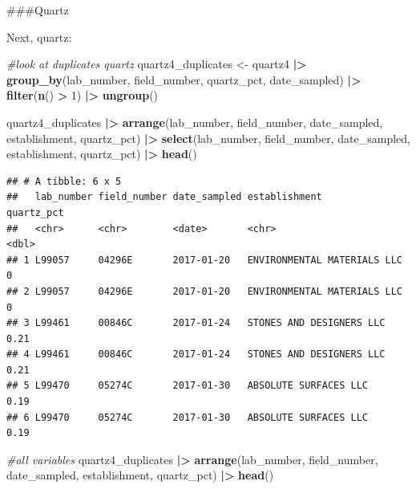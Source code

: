 \documentclass[
]{article}
\newenvironment{Shaded}{\begin{snugshade}}{\end{snugshade}}
\newcommand{\CommentTok}[1]{\textcolor[rgb]{0.56,0.35,0.01}{\textit{#1}}}
\newcommand{\DecValTok}[1]{\textcolor[rgb]{0.00,0.00,0.81}{#1}}
\newcommand{\FunctionTok}[1]{\textcolor[rgb]{0.13,0.29,0.53}{\textbf{#1}}}
\newcommand{\NormalTok}[1]{#1}
\newcommand{\OtherTok}[1]{\textcolor[rgb]{0.56,0.35,0.01}{#1}}
\newcommand{\SpecialCharTok}[1]{\textcolor[rgb]{0.81,0.36,0.00}{\textbf{#1}}}
\begin{document}
\#\#\#Quartz

Next, quartz:

\begin{Shaded}
\begin{Highlighting}[]
\CommentTok{\#look at duplicates quartz}
\NormalTok{quartz4\_duplicates }\OtherTok{\textless{}{-}}\NormalTok{ quartz4 }\SpecialCharTok{|\textgreater{}}
  \FunctionTok{group\_by}\NormalTok{(lab\_number, field\_number, quartz\_pct, date\_sampled) }\SpecialCharTok{|\textgreater{}}
  \FunctionTok{filter}\NormalTok{(}\FunctionTok{n}\NormalTok{() }\SpecialCharTok{\textgreater{}} \DecValTok{1}\NormalTok{) }\SpecialCharTok{|\textgreater{}}
  \FunctionTok{ungroup}\NormalTok{() }

\NormalTok{quartz4\_duplicates }\SpecialCharTok{|\textgreater{}}  
  \FunctionTok{arrange}\NormalTok{(lab\_number, field\_number, date\_sampled, establishment, quartz\_pct) }\SpecialCharTok{|\textgreater{}} 
  \FunctionTok{select}\NormalTok{(lab\_number, field\_number, date\_sampled, establishment, quartz\_pct) }\SpecialCharTok{|\textgreater{}} 
  \FunctionTok{head}\NormalTok{()}
\end{Highlighting}
\end{Shaded}

\begin{verbatim}
## # A tibble: 6 x 5
##   lab_number field_number date_sampled establishment               quartz_pct
##   <chr>      <chr>        <date>       <chr>                            <dbl>
## 1 L99057     04296E       2017-01-20   ENVIRONMENTAL MATERIALS LLC       0   
## 2 L99057     04296E       2017-01-20   ENVIRONMENTAL MATERIALS LLC       0   
## 3 L99461     00846C       2017-01-24   STONES AND DESIGNERS LLC          0.21
## 4 L99461     00846C       2017-01-24   STONES AND DESIGNERS LLC          0.21
## 5 L99470     05274C       2017-01-30   ABSOLUTE SURFACES LLC             0.19
## 6 L99470     05274C       2017-01-30   ABSOLUTE SURFACES LLC             0.19
\end{verbatim}

\begin{Shaded}
\begin{Highlighting}[]
\CommentTok{\#all variables }
\NormalTok{quartz4\_duplicates }\SpecialCharTok{|\textgreater{}}   
  \FunctionTok{arrange}\NormalTok{(lab\_number, field\_number, date\_sampled, establishment, quartz\_pct) }\SpecialCharTok{|\textgreater{}} 
  \FunctionTok{head}\NormalTok{()}
\end{Highlighting}
\end{Shaded}
\end{document}

